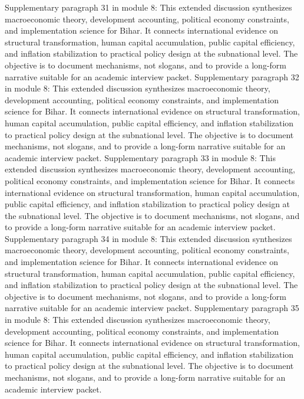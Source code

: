 \documentclass[preprint,12pt]{elsarticle}
\begin{document}
Supplementary paragraph 31 in module 8: This extended discussion synthesizes macroeconomic theory, development accounting, political economy constraints, and implementation science for Bihar. It connects international evidence on structural transformation, human capital accumulation, public capital efficiency, and inflation stabilization to practical policy design at the subnational level. The objective is to document mechanisms, not slogans, and to provide a long-form narrative suitable for an academic interview packet.
Supplementary paragraph 32 in module 8: This extended discussion synthesizes macroeconomic theory, development accounting, political economy constraints, and implementation science for Bihar. It connects international evidence on structural transformation, human capital accumulation, public capital efficiency, and inflation stabilization to practical policy design at the subnational level. The objective is to document mechanisms, not slogans, and to provide a long-form narrative suitable for an academic interview packet.
Supplementary paragraph 33 in module 8: This extended discussion synthesizes macroeconomic theory, development accounting, political economy constraints, and implementation science for Bihar. It connects international evidence on structural transformation, human capital accumulation, public capital efficiency, and inflation stabilization to practical policy design at the subnational level. The objective is to document mechanisms, not slogans, and to provide a long-form narrative suitable for an academic interview packet.
Supplementary paragraph 34 in module 8: This extended discussion synthesizes macroeconomic theory, development accounting, political economy constraints, and implementation science for Bihar. It connects international evidence on structural transformation, human capital accumulation, public capital efficiency, and inflation stabilization to practical policy design at the subnational level. The objective is to document mechanisms, not slogans, and to provide a long-form narrative suitable for an academic interview packet.
Supplementary paragraph 35 in module 8: This extended discussion synthesizes macroeconomic theory, development accounting, political economy constraints, and implementation science for Bihar. It connects international evidence on structural transformation, human capital accumulation, public capital efficiency, and inflation stabilization to practical policy design at the subnational level. The objective is to document mechanisms, not slogans, and to provide a long-form narrative suitable for an academic interview packet.
\end{document}
